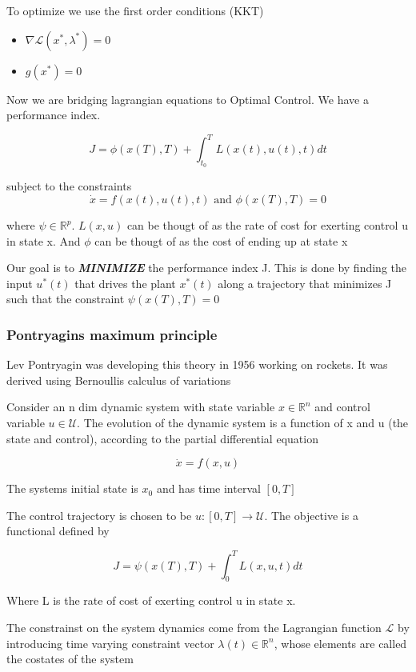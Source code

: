\documentclass[11pt, a4paper]{article} %
\begin{document}
To optimize we use the first order conditions (KKT) 

\begin{itemize}
    \item $\nabla \mathcal{L}(x^*, \lambda^*) = 0$
    \item $g(x^*)=0$
\end{itemize}


Now we are bridging lagrangian equations to Optimal Control. We have a performance index. 

\[
    J = \phi(x(T), T) + \int_{t_0}^{T}L(x(t), u(t), t) dt
\]

subject to the constraints
\[
    \dot{x} = f(x(t), u(t), t) \text{ and } \phi(x(T), T) =0
\]

where $ \psi \in \mathbb{R}^p $. $ L(x,u) $ can be thougt of as the rate of cost for exerting control u in state x. And $ \phi $ can be thougt of as the cost of ending up at state x

Our goal is to \textbf{\textit{MINIMIZE}} the performance index J. This is done by finding the input $ u^*(t) $ that drives the plant $ x^*(t) $ along a trajectory that minimizes J such that the constraint $ \psi(x(T), T) = 0 $   



\subsubsection{Pontryagins maximum principle}

Lev Pontryagin was developing this theory in 1956 working on rockets. It was derived using Bernoullis calculus of variations

Consider an n dim dynamic system with state variable $ x \in \mathbb{R}^n $ and control variable $ u \in \mathcal{U} $. The evolution of the dynamic system is a function of x and u (the state and control),  according to the partial differential equation 

\[
    \dot{x} = f(x, u)
\]

The systems initial state is $ x_0 $ and has time interval $ \left[ 0, T \right]  $  

The control trajectory is chosen to be $ u: \left[ 0, T \right] \rightarrow \mathcal{U} $. The objective is a functional defined by 

\[
    J = \psi(x(T), T) + \int_{0}^{T}L(x, u, t) dt
\]

Where L is the rate of cost of exerting control u in state x.


The constrainst on the system dynamics come from the Lagrangian function $ \mathcal{L} $ by introducing time varying constraint vector $ \lambda(t) \in \mathbb{R}^n $, whose elements are called the costates of the system 
\end{document}
